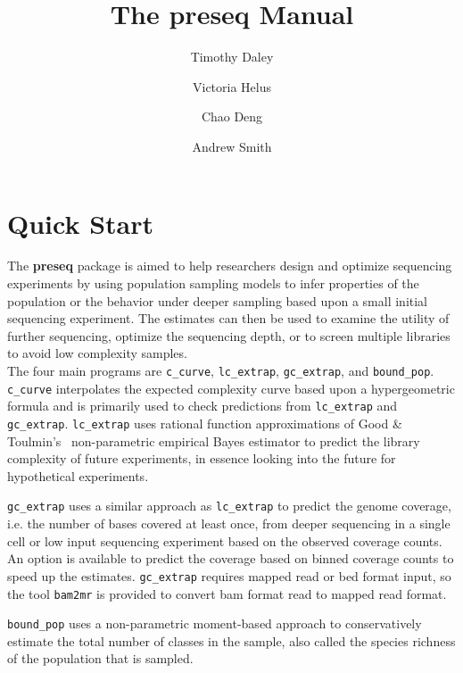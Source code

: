 \documentclass[11pt, titlepage]{article}
\title{The \textbf{preseq} Manual}
\author{Timothy Daley \and Victoria Helus \and Chao Deng \and Andrew Smith }
\begin{document}
\maketitle

\tableofcontents

\newpage

\section{Quick Start}
\label{chap:quickstart}
\newcommand{\fn}[1]{\texttt{#1}}



The \textbf{preseq} package is aimed to help researchers
design and optimize sequencing experiments by using
population sampling models to infer properties of the
population or the behavior under deeper sampling based 
upon a small initial sequencing experiment.  The estimates
can then be used to examine the utility of further
sequencing, optimize the sequencing depth,
or to screen multiple libraries to avoid low complexity
samples.~\\[-.2cm]

\noindent The four main programs are \fn{c\_curve}, 
\fn{lc\_extrap}, \fn{gc\_extrap}, and \fn{bound\_pop}.
\fn{c\_curve}  interpolates the expected complexity
curve based upon a hypergeometric formula and
is primarily used to check predictions from 
\fn{lc\_extrap} and \fn{gc\_extrap}.  
\fn{lc\_extrap} uses rational function approximations
of Good \& Toulmin's~\cite{good1956number} non-parametric
empirical Bayes estimator to predict the library complexity
of future experiments, in essence looking into the future
for hypothetical experiments.  

\fn{gc\_extrap} uses a similar approach as \fn{lc\_extrap}
to predict the genome coverage, 
i.e. the number of bases covered at least once,
from deeper sequencing in a single cell or low input sequencing
experiment based on the observed coverage counts.
An option is available to predict the coverage based on binned
coverage counts to speed up the estimates.  
\fn{gc\_extrap} requires mapped read or bed format
input, so the tool \fn{bam2mr} is provided to convert
bam format read to mapped read format.

\fn{bound\_pop} uses a non-parametric moment-based
approach to conservatively estimate the total number
of classes in the sample, also called the species
richness of the population that is sampled.


\newpage
\end{document}
